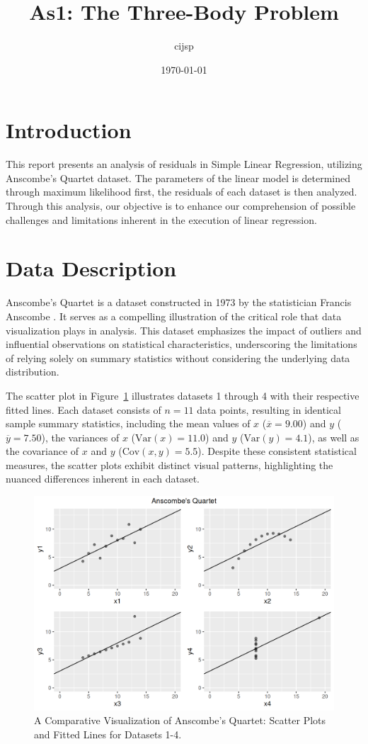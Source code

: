 \documentclass[12pt]{article}
\title{As1: The Three-Body Problem}
\author{cijsp}
\date{\today}
\begin{document}
	
	\maketitle
	
	\section{Introduction}

This report presents an analysis of residuals in Simple Linear Regression, utilizing Anscombe's Quartet dataset. The parameters of the linear model is determined through maximum likelihood first, the residuals of each dataset is then analyzed. Through this analysis, our objective is to enhance our comprehension of possible challenges and limitations inherent in the execution of linear regression.
	
	\section{Data Description}
	
Anscombe's Quartet is a dataset constructed in 1973 by the statistician Francis Anscombe \citep{Anscombe1973}. It serves as a compelling illustration of the critical role that data visualization plays in analysis. This dataset emphasizes the impact of outliers and influential observations on statistical characteristics, underscoring the limitations of relying solely on summary statistics without considering the underlying data distribution.

The scatter plot in Figure~\ref{Fig:anscombe} illustrates datasets 1 through 4 with their respective fitted lines. Each dataset consists of $n=11$ data points, resulting in identical sample summary statistics, including the mean values of $x$ ($\overline{x} = 9.00$) and $y$ ($\overline{y} = 7.50$), the variances of $x$ ($\text{Var}(x) = 11.0$) and $y$ ($\text{Var}(y) = 4.1$), as well as the covariance of $x$ and $y$ ($\text{Cov}\left(x,y\right)=5.5$). Despite these consistent statistical measures, the scatter plots exhibit distinct visual patterns, highlighting the nuanced differences inherent in each dataset.

\begin{figure}[htbp]
\includegraphics[width=.7\textwidth]{anscombe.png}
\centering
\caption{A Comparative Visualization of Anscombe's Quartet: Scatter Plots and Fitted Lines for Datasets 1-4.}
\label{Fig:anscombe}
\end{figure}
\end{document}
